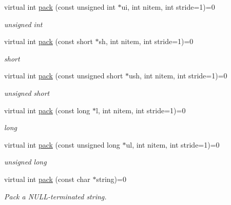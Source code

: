 \begin{Indent}
\begin{DoxyCompactItemize}
\mbox{\label{classMWRMComm_acd1255e2b9c9af469c9d44c28b1cc530}} 
virtual int \hyperlink{classMWRMComm_acd1255e2b9c9af469c9d44c28b1cc530}{pack} (const unsigned int $\ast$ui, int nitem, int stride=1)=0
\begin{DoxyCompactList}\small\item\em unsigned int \end{DoxyCompactList}\item 
\mbox{\label{classMWRMComm_a67a843ece78582381c2f5bb43b1fecb1}} 
virtual int \hyperlink{classMWRMComm_a67a843ece78582381c2f5bb43b1fecb1}{pack} (const short $\ast$sh, int nitem, int stride=1)=0
\begin{DoxyCompactList}\small\item\em short \end{DoxyCompactList}\item 
\mbox{\label{classMWRMComm_a1e0c5e96072b649676c5ee41637da973}} 
virtual int \hyperlink{classMWRMComm_a1e0c5e96072b649676c5ee41637da973}{pack} (const unsigned short $\ast$ush, int nitem, int stride=1)=0
\begin{DoxyCompactList}\small\item\em unsigned short \end{DoxyCompactList}\item 
\mbox{\label{classMWRMComm_a11ab3f7099236acb71b32271a1b31cc8}} 
virtual int \hyperlink{classMWRMComm_a11ab3f7099236acb71b32271a1b31cc8}{pack} (const long $\ast$l, int nitem, int stride=1)=0
\begin{DoxyCompactList}\small\item\em long \end{DoxyCompactList}\item 
\mbox{\label{classMWRMComm_a60cf34f0d51540b7aac88b43eabdf6ef}} 
virtual int \hyperlink{classMWRMComm_a60cf34f0d51540b7aac88b43eabdf6ef}{pack} (const unsigned long $\ast$ul, int nitem, int stride=1)=0
\begin{DoxyCompactList}\small\item\em unsigned long \end{DoxyCompactList}\item 
\mbox{\label{classMWRMComm_a28ff1802b9abdf3b7e9d8d927ecc0308}} 
virtual int \hyperlink{classMWRMComm_a28ff1802b9abdf3b7e9d8d927ecc0308}{pack} (const char $\ast$string)=0
\begin{DoxyCompactList}\small\item\em Pack a N\+U\+L\+L-\/terminated string. \end{DoxyCompactList}\end{DoxyCompactItemize}
\end{Indent}
